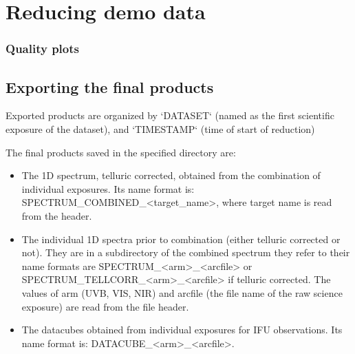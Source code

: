 
\section{Reducing demo data}
\label{sec:reducing_demo_data}



 
\subsubsection{Quality plots}


\subsection{Exporting the final products}
\label{sec:export_final_products}



 
 
Exported products are organized by `DATASET` (named as the first
scientific exposure of the dataset), and `TIMESTAMP` (time of start of
reduction)

The final products saved in the specified directory are: 

\begin{itemize}

\item The 1D spectrum, telluric corrected, obtained from the
  combination of individual exposures. Its name format is:
  SPECTRUM\_COMBINED\_<target\_name>, where target name is read from
  the header.

\item The individual 1D spectra prior to combination (either telluric
  corrected or not). They are in a subdirectory of the combined
  spectrum they refer to their name formats are
  SPECTRUM\_<arm>\_<arcfile> or SPECTRUM\_TELLCORR\_<arm>\_<arcfile>
  if telluric corrected. The values of arm (UVB, VIS, NIR) and arcfile
  (the file name of the raw science exposure) are read from the file
  header.

\item The datacubes obtained from individual exposures for IFU
  observations. Its name format is: DATACUBE\_<arm>\_<arcfile>.

\end{itemize}
